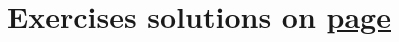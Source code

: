 


		
\section*{Exercises \hfill \normalfont\textsf{\small solutions on \hyperlink{solutions_glider_synthesis}{page \pageref{solutions_glider_synthesis}}}}
\label{sec:synthesis_exercises}
